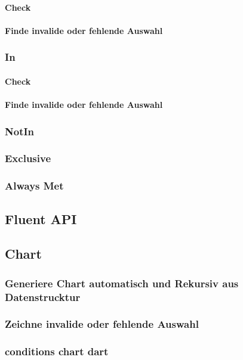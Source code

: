 \documentclass[12pt, twoside]{article}
\begin{document}
\paragraph{Check}
\paragraph{Finde invalide oder fehlende Auswahl}

\subsubsection{In}
\paragraph{Check}
\paragraph{Finde invalide oder fehlende Auswahl}


\subsubsection{NotIn}
\subsubsection{Exclusive}
\subsubsection{Always Met}


\subsection{Fluent API} 


\subsection{Chart}
\subsubsection{Generiere Chart automatisch und Rekursiv aus Datenstrucktur}
\subsubsection{Zeichne invalide oder fehlende Auswahl}

\subsubsection{conditions chart dart}
\end{document}
